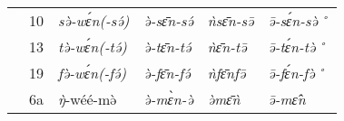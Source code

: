 \documentclass[output=paper]{langsci/langscibook}
\begin{document}
\begin{table}
\begin{tabularx}{\textwidth}{ll lllX llll}
& 10 & \multicolumn{2}{l}{{\textit{{sə̀-wɛ́n(-sə́)}}}} & \multicolumn{2}{l}{\textit{ə̀-sɛ̄n-sə́}} & \multicolumn{2}{l}{\textit{ǹsɛ̄n-sə̄}} & \multicolumn{2}{l}{\textit{ə̄-sɛ́n-sə̀˚}}\\
& 13 & \multicolumn{2}{l}{{\textit{{tə̀-wɛ́n(-tə́)}}}} & \multicolumn{2}{l}{\textit{ə̀-tɛ̄n-tə́}} & \multicolumn{2}{l}{\textit{ǹɛ̄n-tə̄}} & \multicolumn{2}{l}{\textit{ə̄-tɛ́n-tə̀˚}}\\
& 19 & \multicolumn{2}{l}{{\textit{{fə̀-wɛ́n(-fə́)}}}} & \multicolumn{2}{l}{\textit{ə̀-fɛ̄n-fə́}} & \multicolumn{2}{l}{\textit{ǹfɛ̄nfə̄}} & \multicolumn{2}{l}{\textit{ə̄-fɛ́n-fə̀˚}}\\
& 6a & \multicolumn{2}{l}{{\textit{\`{ŋ}}-wéé-mə̀}} & \multicolumn{2}{l}{\textit{ə̀-mɛ̀n-ə̀}} & \multicolumn{2}{l}{\textit{ə̀mɛ̄ǹ}} & \multicolumn{2}{l}{\textit{ə̄-mɛ̂n}}\\

\end{tabularx}
\end{table}
\end{document}

